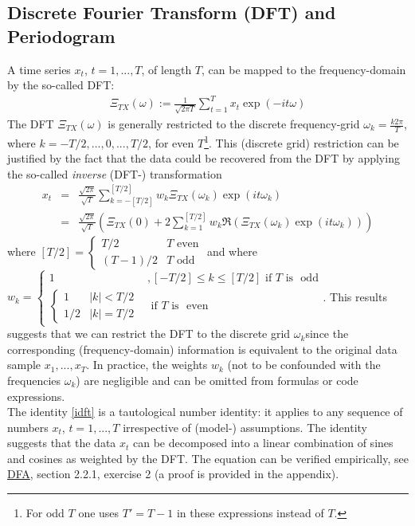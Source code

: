 \documentclass[a4paper]{book}
\begin{document}
\subsection{Discrete Fourier Transform (DFT) and Periodogram}\label{dft_and_per}

A time series $x_t$, $t=1,...,T$, of length $T$, can be mapped to the frequency-domain by the so-called DFT:
\begin{eqnarray}\label{dft}
\Xi_{TX}(\omega):=\frac{1}{\sqrt{2\pi T}}\sum_{t=1}^Tx_t\exp(-it\omega)
\end{eqnarray}
The DFT $\Xi_{TX}(\omega)$ is generally restricted to the discrete frequency-grid
$\omega_k=\displaystyle{\frac{k2\pi}{T}}$, where $k=-T/2,...,0,...,T/2$, for even $T$\footnote{For odd $T$ one uses $T'=T-1$ in these expressions instead of $T$.}. This (discrete grid) restriction can be justified by the fact that the data could be recovered from the DFT by applying the so-called \emph{inverse} (DFT-) transformation
\begin{eqnarray}\label{idft}
x_t&=&\frac{\sqrt{2\pi}}{\sqrt{ T}}\sum_{k=-[T/2]}^{[T/2]} w_k\Xi_{TX}(\omega_k)\exp(it\omega_k )\\
&=&\frac{\sqrt{2\pi}}{\sqrt{ T}}\left(\Xi_{TX}(0)+2\sum_{k=1}^{[T/2]} w_k\Re\left(\Xi_{TX}(\omega_k)\exp(it\omega_k )\right)\right)\label{idft2}
\end{eqnarray}
where $[T/2]=\displaystyle{\left\{\begin{array}{cc}T/2& T\textrm{~even}\\(T-1)/2&T\textrm{~odd}\end{array}\right.}$ and where \\
$w_k=\left\{\begin{array}{cc}1&,[-T/2]\leq k\leq [T/2] \textrm{~if~} T \textrm{~is ~odd}\\
\left\{\begin{array}{cc}1&|k|<T/2\\1/2&|k|=T/2\end{array}\right.&\textrm{~if~} T \textrm{~is ~even}
\end{array}\right.$. This results suggests that we can restrict the DFT to the discrete grid $\omega_k$since the corresponding (frequency-domain) information is equivalent to the original data sample $x_1,...,x_T$. In practice, the weights $w_k$ (not to be confounded with the frequencies $\omega_k$) are negligible and can be omitted from formulas or code expressions. \\

The identity \ref{idft} is a tautological number identity: it applies to any sequence of numbers $x_t$, $t=1,...,T$ irrespective of (model-) assumptions. The identity suggests that the data $x_t$ can be decomposed into a linear combination of sines and cosines 
as weighted by the DFT. The equation can be verified empirically, see \href{http://blog.zhaw.ch/sef/files/2014/10/DFA.pdf}{DFA}, section 2.2.1, exercise 2 (a proof is provided in the appendix).\\
\end{document}
